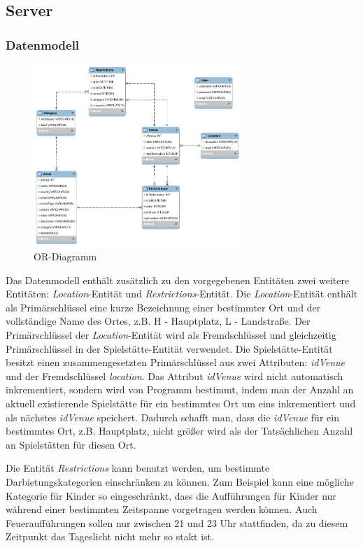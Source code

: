 \documentclass[12pt, a4paper]{article}
\begin{document}
\subsection{Server}
\subsubsection{Datenmodell}

\begin{figure}[h] 	
	\centering
		\includegraphics[width=0.7\textwidth]{DbDiagramm.png}
	\caption{OR-Diagramm}
\end{figure}

Das Datenmodell enthält zusätzlich zu den vorgegebenen Entitäten zwei weitere Entitäten: \textit{Location}-Entität und \textit{Restrictions}-Entität. Die \textit{Location}-Entität enthält als Primärschlüssel eine kurze Bezeichnung einer bestimmter Ort und der vollständige Name des Ortes, z.B. H - Hauptplatz, L - Landstraße. Der Primärschlüssel der \textit{Location}-Entität wird als Fremdschlüssel und gleichzeitig Primärschlüssel in der Spielstätte-Entität verwendet. Die Spielstätte-Entität besitzt einen zusammengesetzten Primärschlüssel aus zwei Attributen: \textit{idVenue} und der Fremdschlüssel \textit{location}. Das Attribut \textit{idVenue} wird nicht automatisch inkrementiert, sondern wird von Programm bestimmt, indem man der Anzahl an aktuell existierende Spielstätte für ein bestimmtes Ort um eins inkrementiert und als nächstes \textit{idVenue} speichert. Dadurch schafft man, dass die \textit{idVenue} für ein bestimmtes Ort, z.B. Hauptplatz, nicht größer wird als der Tatsächlichen Anzahl an Spielstätten für diesen Ort.

Die Entität \textit{Restrictions} kann benutzt werden, um bestimmte Darbietungskategorien einschränken zu können. Zum Beispiel kann eine mögliche Kategorie für Kinder so eingeschränkt, dass die Aufführungen für Kinder nur während einer bestimmten Zeitspanne vorgetragen werden können. Auch Feueraufführungen sollen nur zwischen 21 und 23 Uhr stattfinden, da zu diesem Zeitpunkt das Tageslicht nicht mehr so stakt ist. 
\end{document}
